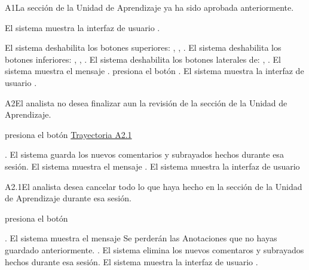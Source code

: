 \begin{UCtrayectoriaA}{A1}{La sección de la Unidad de Aprendizaje ya ha sido aprobada anteriormente.}

	\hypertarget{SP2-CU10-A1}{\UCpaso El sistema muestra la interfaz de usuario .}
    \UCpaso El sistema deshabilita los botones superiores: , , .
    \UCpaso El sistema deshabilita los botones inferiores: , , .
    \UCpaso El sistema deshabilita los botones laterales de: , .
    \UCpaso El sistema muestra el mensaje .
    \UCpaso[\UCactor] presiona el botón .
    \UCpaso El sistema muestra la interfaz de usuario .
\end{UCtrayectoriaA}

	
\begin{UCtrayectoriaA}{A2}{El analista no desea finalizar aun la revisión de la sección de la Unidad de Aprendizaje.}

    \hypertarget{SP2-CU10-A2}{\UCpaso[\UCactor] presiona el botón  \hyperlink{SP2-CU10-A2.1}{Trayectoria A2.1}}. 
    \UCpaso El sistema guarda los nuevos comentarios y subrayados hechos durante esa sesión.
    \UCpaso El sistema muestra el mensaje .
    \UCpaso El sistema muestra la interfaz de usuario 
\end{UCtrayectoriaA}

\begin{UCtrayectoriaA}{A2.1}{El analista desea cancelar todo lo que haya hecho en la sección de la Unidad de Aprendizaje durante esa sesión.}

	\hypertarget{SP2-CU10-A2.1}{\UCpaso[\UCactor] presiona el botón }. 
    \UCpaso El sistema muestra el mensaje 
Se perderán las Anotaciones que no hayas guardado anteriormente. .
    \UCpaso El sistema elimina los nuevos comentaros y subrayados hechos durante esa sesión.
    \UCpaso El sistema muestra la interfaz de usuario .
\end{UCtrayectoriaA}

